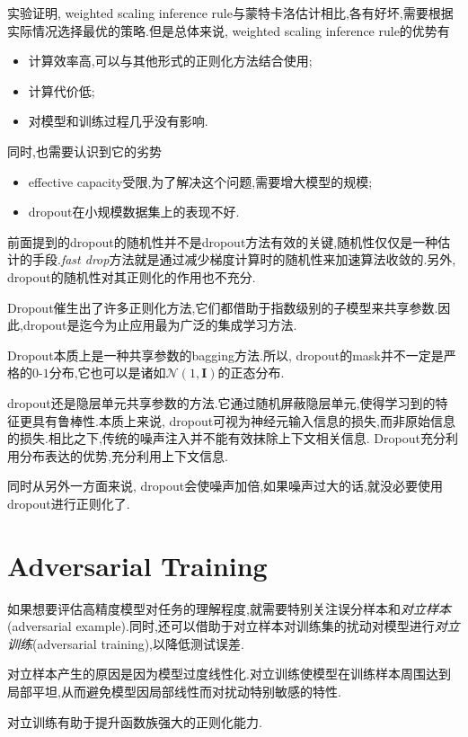 实验证明, weighted scaling inference rule与蒙特卡洛估计相比,各有好坏,需要根据实际情况选择最优的策略.但是总体来说, weighted scaling inference rule的优势有
\begin{itemize}
    \item 计算效率高,可以与其他形式的正则化方法结合使用;
    \item 计算代价低;
    \item 对模型和训练过程几乎没有影响.
\end{itemize}
同时,也需要认识到它的劣势
\begin{itemize}
    \item effective capacity受限,为了解决这个问题,需要增大模型的规模;
    \item dropout在小规模数据集上的表现不好.
\end{itemize}

前面提到的dropout的随机性并不是dropout方法有效的关键,随机性仅仅是一种估计的手段.\textit{fast drop}方法就是通过减少梯度计算时的随机性来加速算法收敛的.另外, dropout的随机性对其正则化的作用也不充分.

Dropout催生出了许多正则化方法,它们都借助于指数级别的子模型来共享参数.因此,dropout是迄今为止应用最为广泛的集成学习方法.

Dropout本质上是一种共享参数的bagging方法.所以, dropout的mask并不一定是严格的$0$-$1$分布,它也可以是诸如$\mathcal N(1,\mathbf I)$的正态分布.

dropout还是隐层单元共享参数的方法.它通过随机屏蔽隐层单元,使得学习到的特征更具有鲁棒性.本质上来说, dropout可视为神经元输入信息的损失,而非原始信息的损失.相比之下,传统的噪声注入并不能有效抹除上下文相关信息. Dropout充分利用分布表达的优势,充分利用上下文信息.

同时从另外一方面来说, dropout会使噪声加倍,如果噪声过大的话,就没必要使用dropout进行正则化了.

\section{Adversarial Training}

如果想要评估高精度模型对任务的理解程度,就需要特别关注误分样本和\textit{对立样本}(adversarial example).同时,还可以借助于对立样本对训练集的扰动对模型进行\textit{对立训练}(adversarial training),以降低测试误差.

对立样本产生的原因是因为模型过度线性化.对立训练使模型在训练样本周围达到局部平坦,从而避免模型因局部线性而对扰动特别敏感的特性.

对立训练有助于提升函数族强大的正则化能力.

